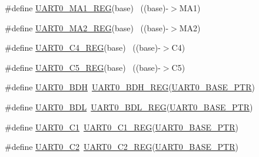 \begin{DoxyCompactItemize}
\item 
\#define \hyperlink{group___u_a_r_t0___register___accessor___macros_ga816c5853220eec2ae21d55bb06fca86d}{U\+A\+R\+T0\+\_\+\+M\+A1\+\_\+\+R\+EG}(base)                                        ~((base)-\/$>$M\+A1)
\item 
\#define \hyperlink{group___u_a_r_t0___register___accessor___macros_ga3e06e7b1da53413767f86e8e5aae8900}{U\+A\+R\+T0\+\_\+\+M\+A2\+\_\+\+R\+EG}(base)                                        ~((base)-\/$>$M\+A2)
\item 
\#define \hyperlink{group___u_a_r_t0___register___accessor___macros_gabc4a3f220e1d978c3fcca2b38a1fc599}{U\+A\+R\+T0\+\_\+\+C4\+\_\+\+R\+EG}(base)                                          ~((base)-\/$>$C4)
\item 
\#define \hyperlink{group___u_a_r_t0___register___accessor___macros_ga852f349be956e4aa40d470695a17b7c0}{U\+A\+R\+T0\+\_\+\+C5\+\_\+\+R\+EG}(base)                                          ~((base)-\/$>$C5)
\item 
\#define \hyperlink{group___u_a_r_t0___register___accessor___macros_ga0f086bea96574c5a4b90ff7ce1a99256}{U\+A\+R\+T0\+\_\+\+B\+DH}~\hyperlink{group___u_a_r_t0___register___accessor___macros_ga1786ecc749d15c69e1f6b3ebb5b07976}{U\+A\+R\+T0\+\_\+\+B\+D\+H\+\_\+\+R\+EG}(\hyperlink{group___u_a_r_t0___peripheral_ga50a02c91ffbd11fa7b4f0c33fe585199}{U\+A\+R\+T0\+\_\+\+B\+A\+S\+E\+\_\+\+P\+TR})
\item 
\#define \hyperlink{group___u_a_r_t0___register___accessor___macros_ga12ffbaeca152984beb3cbd1edaf94ee2}{U\+A\+R\+T0\+\_\+\+B\+DL}~\hyperlink{group___u_a_r_t0___register___accessor___macros_ga9117ec6b275fdf09acabb04ce0d0d6a0}{U\+A\+R\+T0\+\_\+\+B\+D\+L\+\_\+\+R\+EG}(\hyperlink{group___u_a_r_t0___peripheral_ga50a02c91ffbd11fa7b4f0c33fe585199}{U\+A\+R\+T0\+\_\+\+B\+A\+S\+E\+\_\+\+P\+TR})
\item 
\#define \hyperlink{group___u_a_r_t0___register___accessor___macros_ga74d107fda097e4ca0559efe5ab105cbf}{U\+A\+R\+T0\+\_\+\+C1}~\hyperlink{group___u_a_r_t0___register___accessor___macros_ga923e607588dfd8dd218e437afaa00c71}{U\+A\+R\+T0\+\_\+\+C1\+\_\+\+R\+EG}(\hyperlink{group___u_a_r_t0___peripheral_ga50a02c91ffbd11fa7b4f0c33fe585199}{U\+A\+R\+T0\+\_\+\+B\+A\+S\+E\+\_\+\+P\+TR})
\item 
\#define \hyperlink{group___u_a_r_t0___register___accessor___macros_gaa96db8ca05ad8075993439b98fc41e04}{U\+A\+R\+T0\+\_\+\+C2}~\hyperlink{group___u_a_r_t0___register___accessor___macros_gafb7e1fb088da5fb6b39ef150333580c7}{U\+A\+R\+T0\+\_\+\+C2\+\_\+\+R\+EG}(\hyperlink{group___u_a_r_t0___peripheral_ga50a02c91ffbd11fa7b4f0c33fe585199}{U\+A\+R\+T0\+\_\+\+B\+A\+S\+E\+\_\+\+P\+TR})

\end{DoxyCompactItemize}
